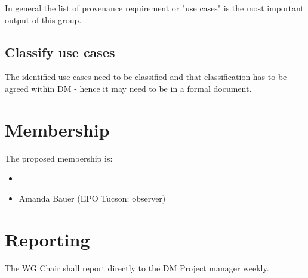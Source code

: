 In general the list of \gls{provenance} requirement or  "use cases"  is the most important output of this group.
\subsection{Classify use cases}
The identified use cases need to be classified and that classification has to be agreed within \gls{DM} - hence it may need to be in a formal document.



\section{Membership}

The proposed membership is:

\begin{itemize}
    \item
    \item Amanda Bauer (\gls{EPO} Tucson; observer)
\end{itemize}


\section{Reporting}

The \gls{WG} Chair shall report directly to the \gls{DM} Project manager weekly.
